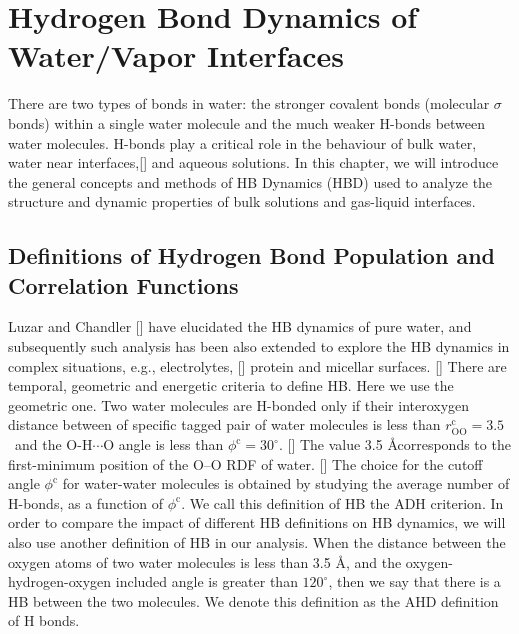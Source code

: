 \chapter{Hydrogen Bond Dynamics of Water/Vapor Interfaces }\label{CHAPTER_HB}
There are two types of bonds in water: the stronger covalent bonds (molecular $\sigma$ bonds) within a single water molecule and 
the much weaker H-bonds between water molecules.
H-bonds play a critical role in the behaviour of bulk water,\cite{Eisenberg1969,Luzar1996,Cabane2005} water near interfaces,[] 
and aqueous solutions. \cite{Naslund2005} 
In this chapter, we will introduce the general concepts and methods of HB Dynamics (HBD)\cite{AL96,Luzar1996,DC87} used to analyze the structure 
and dynamic properties of bulk solutions and gas-liquid interfaces. 

\section{Definitions of Hydrogen Bond Population and Correlation Functions}
Luzar and Chandler [\cite{AL96}] have elucidated the HB dynamics of pure water, and
subsequently such analysis has been also extended to explore the HB dynamics
in complex situations, e.g., electrolytes, [\cite{AC00}] protein and  micellar surfaces. [\cite{SP05}]
There are temporal, geometric and energetic criteria to define HB. Here we use the geometric one.
Two water molecules are H-bonded only if their interoxygen distance between of specific tagged pair of water molecules 
is less than $r^{\text{c}}_{\text{OO}}=3.5$ \A \ and
the O-H$\cdots$O angle is less than $\phi^{\text{c}}=30^{\circ}$. [\cite{AKS86,JT90,SB02}] 
The value 3.5 \AA corresponds to the first-minimum position of the O--O RDF of water. [\cite{Sciortino1989}]   
The choice for the cutoff angle $\phi^{\text{c}}$ for water-water molecules is obtained by studying the average number of H-bonds,
as a function of $\phi^{\text{c}}$. \cite{Luzar1993} We call this definition of HB the ADH criterion. 
In order to compare the impact of different HB definitions on HB dynamics, we will also use another definition of HB in our analysis. 
When the distance between the oxygen atoms of two water molecules is less than 3.5 \AA, 
and the oxygen-hydrogen-oxygen included angle is greater than $120^{\circ}$, then we say that there is a HB between the two molecules. 
We denote this definition as the AHD definition of H bonds.

